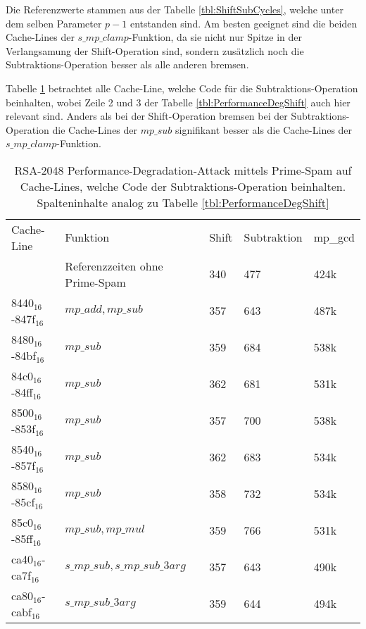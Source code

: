 Die Referenzwerte stammen aus der Tabelle \ref{tbl:ShiftSubCycles}, welche unter dem selben Parameter $p-1$ entstanden sind.
Am besten geeignet sind die beiden Cache-Lines der $s\_mp\_clamp$-Funktion, da sie nicht nur Spitze in der Verlangsamung der Shift-Operation sind, sondern zusätzlich noch die Subtraktions-Operation besser als alle anderen bremsen.

Tabelle \ref{tbl:PerformanceDegSub} betrachtet alle Cache-Line, welche Code für die Subtraktions-Operation beinhalten, wobei Zeile 2 und 3 der Tabelle \ref{tbl:PerformanceDegShift} auch hier relevant sind.
Anders als bei der Shift-Operation bremsen bei der Subtraktions-Operation die Cache-Lines der $mp\_sub$ signifikant besser als die Cache-Lines der $s\_mp\_clamp$-Funktion.

\begin{table}[h]
\label{tbl:PerformanceDegSub}
\caption{RSA-2048 Performance-Degradation-Attack mittels Prime-Spam auf Cache-Lines, welche Code der Subtraktions-Operation beinhalten.
Spalteninhalte analog zu Tabelle \ref{tbl:PerformanceDegShift}}
\begin{tabular}{lllll}
Cache-Line & Funktion                     & Shift & Subtraktion & mp\_gcd \\
&Referenzzeiten ohne Prime-Spam                         & 340   & 477         & 424k    \\
8440$_{16}$-847f$_{16}$  & $mp\_add, mp\_sub$             & 357   & 643         & 487k    \\
8480$_{16}$-84bf$_{16}$  & $mp\_sub$                      & 359   & 684         & 538k    \\
84c0$_{16}$-84ff$_{16}$  & $mp\_sub$                      & 362   & 681         & 531k    \\
8500$_{16}$-853f$_{16}$  & $mp\_sub$                      & 357   & 700         & 538k    \\
8540$_{16}$-857f$_{16}$  & $mp\_sub$                      & 362   & 683         & 534k    \\
8580$_{16}$-85cf$_{16}$  & $mp\_sub$                      & 358   & 732         & 534k    \\
85c0$_{16}$-85ff$_{16}$  & $mp\_sub, mp\_mul$            & 359   & 766         & 531k    \\
ca40$_{16}$-ca7f$_{16}$  & $s\_mp\_sub, s\_mp\_sub\_3arg$ & 357   & 643         & 490k    \\
ca80$_{16}$-cabf$_{16}$  & $s\_mp\_sub\_3arg$             & 359   & 644         & 494k    \\

\end{tabular}
\end{table}
